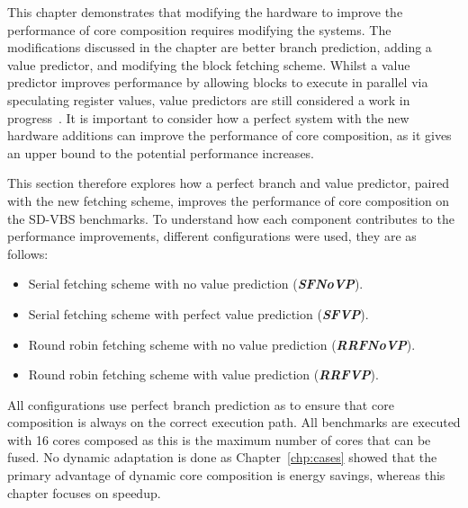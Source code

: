 \newcommand{\novp}{\textit{\textbf{SFNoVP}}}
\newcommand{\vp}{\textit{\textbf{SFVP}}}
\newcommand{\nfnovp}{\textit{\textbf{RRFNoVP}}}
\newcommand{\nfvp}{\textit{\textbf{RRFVP}}}

\newcommand{\optvp}{\textit{\textbf{OptVP}}}
\newcommand{\vt}{\textit{\textbf{VT}}}
\newcommand{\nfvt}{\textit{\textbf{RFVT}}}
\vspace{-1em}

This chapter demonstrates that modifying the hardware to improve the performance of core composition requires modifying the systems.
The modifications discussed in the chapter are better branch prediction, adding a value predictor, and modifying the block fetching scheme.
Whilst a value predictor improves performance by allowing blocks to execute in parallel via speculating register values, value predictors are still considered a work in progress~\cite{peraisBeBop2015}.
It is important to consider how a perfect system with the new hardware additions can improve the performance of core composition, as it gives an upper bound to the potential performance increases.

This section therefore explores how a perfect branch and value predictor, paired with the new fetching scheme, improves the performance of core composition on the SD-VBS benchmarks.
To understand how each component contributes to the performance improvements, different configurations were used, they are as follows:
\begin{itemize}
\item Serial fetching scheme with no value prediction (\novp).
\vspace{-1em}
\item Serial fetching scheme with perfect value prediction (\vp).
\vspace{-1em}
\item Round robin fetching scheme with no value prediction (\nfnovp).
\vspace{-1em}
\item Round robin fetching scheme with value prediction (\nfvp).
\end{itemize}

All configurations use perfect branch prediction as to ensure that core composition is always on the correct execution path.
All benchmarks are executed with 16 cores composed as this is the maximum number of cores that can be fused.
No dynamic adaptation is done as Chapter~\ref{chp:cases} showed that the primary advantage of dynamic core composition is energy savings, whereas this chapter focuses on speedup.


